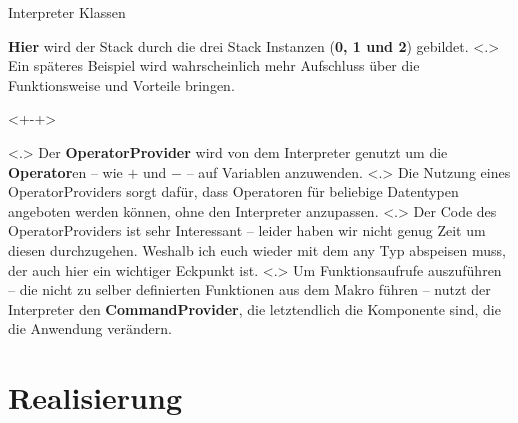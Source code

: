 \begin{frame}{Interpreter Klassen}
\begin{uncoverenv}
{            \textbf{Hier} wird der Stack durch die drei Stack Instanzen (\textbf{0, 1 und 2}) gebildet.
          }
          \note[item]<.>{
            Ein späteres Beispiel wird wahrscheinlich mehr Aufschluss über die Funktionsweise und Vorteile bringen.
          }
    \end{uncoverenv}
    \begin{uncoverenv}<+-+>%
          \note[item]<.>{
            Der \textbf{OperatorProvider} wird von dem Interpreter genutzt um die \textbf{Operator}en -- wie $+$ und $-$ -- auf Variablen anzuwenden.
          }
          \note[item]<.>{
            Die Nutzung eines OperatorProviders sorgt dafür, dass Operatoren für beliebige Datentypen angeboten werden können, ohne den Interpreter anzupassen.
          }
          \note[item]<.>{
            Der Code des OperatorProviders ist sehr Interessant -- leider haben wir nicht genug Zeit um diesen durchzugehen. Weshalb ich euch wieder mit dem any Typ abspeisen muss, der auch hier ein wichtiger Eckpunkt ist.
          }
          \note[item]<.>{
            Um Funktionsaufrufe auszuführen -- die nicht zu selber definierten Funktionen aus dem Makro führen -- nutzt der Interpreter den \textbf{CommandProvider}, die letztendlich die Komponente sind, die die Anwendung verändern.
          }
    \end{uncoverenv}
  \end{frame}

\section{Realisierung}

